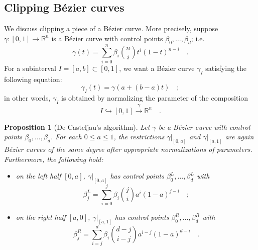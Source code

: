 \documentclass[pdftex,a4paper,12pt]{scrartcl}
\theoremstyle{plain}
\newtheorem{proposition}[theorem]{Proposition}
\theoremstyle{definition}
\theoremstyle{remark}
\numberwithin{equation}{section}
\begin{document}
\subsection{Clipping B\'ezier curves}

We discuss clipping a piece of a B\'ezier curve.
More precisely, suppose $\gamma:[0,1]\to\mathbb R^n$ is a B\'ezier curve with control points $\beta_0,\dots,\beta_d$; i.e.
\[
\gamma(t)
= \sum_{i=0}^n \beta_i\binom{n}{i}t^i(1-t)^{n-i}
\quad.
\]
For a subinterval $I=[a,b]\subset[0,1]$, we want a B\'ezier curve $\gamma_I$ satisfying the following equation:
\[
\gamma_I(t) = \gamma(a+(b-a)t)
\quad;
\]
in other words, $\gamma_I$ is obtained by normalizing the parameter of the composition
\[
I\hookrightarrow[0,1]\xrightarrow{\gamma}\mathbb R^n
\quad.
\]

\begin{proposition}[De Casteljau's algorithm]
\label{prop:de-casteljau}
Let $\gamma$ be a B\'ezier curve with control points $\beta_0,\dots,\beta_d$.
For each $0\le a\le 1$, the restrictions $\left.\gamma\right|_{[0,a]}$ and $\left.\gamma\right|_{[a,1]}$ are again B\'ezier curves of the same degree after appropriate normalizations of parameters.
Furthermore, the following hold:
\begin{itemize}
  \item on the left half $[0,a]$, $\left.\gamma\right|_{[0,a]}$ has control points $\beta^L_0,\dots,\beta^L_d$ with
\[
\beta^L_j = \sum_{i=0}^j\beta_i\binom{j}{i}a^i(1-a)^{j-i}
\quad;
\]
  \item on the right half $[a,0]$, $\left.\gamma\right|_{[a,1]}$ has control points $\beta^R_0,\dots,\beta^R_d$ with
\[
\beta^R_j = \sum_{i=j}^d\beta_i\binom{d-j}{i-j}a^{i-j}(1-a)^{d-i}
\quad.
\]
\end{itemize}
\end{proposition}
\end{document}
